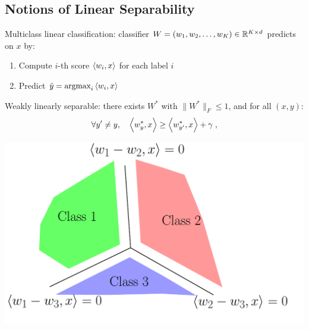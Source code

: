 \documentclass[landscape,a0a,final]{a0poster}
\begin{document}
\begin{multicols}{3}
\section*{Notions of Linear Separability}
Multiclass linear classification: classifier $W = (w_1, w_2, \dots, w_K) \in \mathbb{R}^{K \times d}$ predicts on $x$ by:
\begin{enumerate}
  \item Compute $i$-th score $\left\langle w_i, x \right\rangle$ for each label $i$
  \item Predict $\hat{y} = \operatorname*{argmax}_{i} \left\langle w_i, x \right\rangle$
\end{enumerate}

\begin{minipage}{0.65\linewidth}
Weakly linearly separable: there exists $W^*$ with $\| W^* \|_F \leq 1$, and for all $(x, y)$:
\begin{align*}
\forall y' \neq y, \quad \left\langle w^*_{y}, x \right\rangle \ge \left\langle w^*_{y'}, x \right\rangle + \gamma \; ,
\end{align*}
\end{minipage}
\begin{minipage}{0.35\linewidth}
\includegraphics[width=\linewidth]{figures/weak_sep.pdf}
\end{minipage}


\end{multicols}
\end{document}
